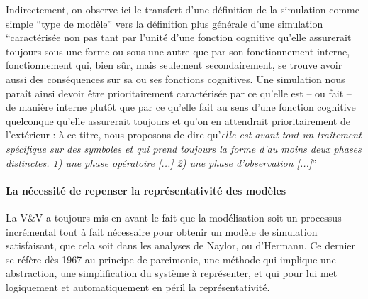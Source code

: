 Indirectement, on observe ici le transfert d'une définition de la simulation comme simple \enquote{type de modèle} vers la définition plus générale d'une simulation \enquote{caractérisée non pas tant par l’unité d’une fonction cognitive qu’elle assurerait toujours sous une forme ou sous une autre que par son fonctionnement interne, fonctionnement qui, bien sûr, mais seulement secondairement, se trouve avoir aussi des conséquences sur sa ou ses fonctions cognitives. Une simulation nous paraît ainsi devoir être prioritairement caractérisée par ce qu’elle est – ou fait – de manière interne plutôt que par ce qu’elle fait au sens d’une fonction cognitive quelconque qu’elle assurerait toujours et qu’on en attendrait prioritairement de l’extérieur : à ce titre, nous proposons de dire qu’\textit{elle est avant tout un traitement spécifique sur des symboles et qui prend toujours la forme d'au moins deux phases distinctes. 1) une phase opératoire [...] 2) une phase d'observation [...]}} \autocite[33-34]{Varenne2013b}

\paragraph{La nécessité de repenser la représentativité des modèles}
\label{p:repenser la representativite}

La V\&V a toujours mis en avant le fait que la modélisation soit un processus incrémental tout à fait nécessaire pour obtenir un modèle de simulation satisfaisant, que cela soit dans les analyses de Naylor, ou d'Hermann. Ce dernier se réfère dès 1967 au principe de parcimonie, une méthode qui implique une abstraction, une simplification du système à représenter, et qui pour lui met logiquement et automatiquement en péril la représentativité. 



